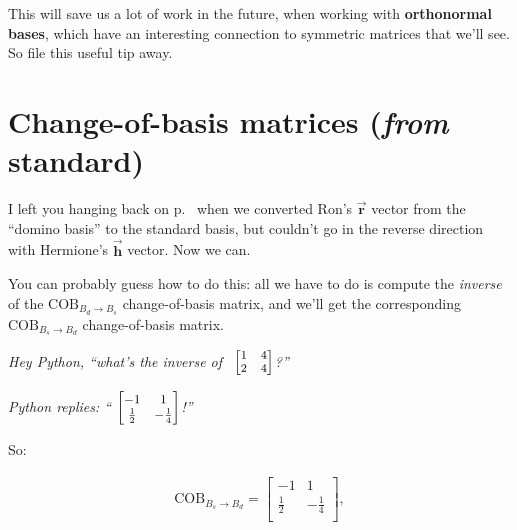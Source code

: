 
This will save us a lot of work in the future, when working with
\textbf{orthonormal bases}, which have an interesting connection to symmetric
matrices that we'll see. So file this useful tip away.


\section[Change-of-basis matrices]{\large Change-of-basis matrices (\textit{from} standard)}

\label{changeOfBasisOtherWayFinally}


I left you hanging back on p.~\pageref{changeOfBasisOtherWayCliffhanger} when
we converted Ron's $\overrightarrow{\textbf{r}}$ vector from the ``domino
basis'' to the standard basis, but couldn't go in the reverse direction with
Hermione's $\overrightarrow{\textbf{h}}$ vector. Now we can.

\smallskip
You can probably guess how to do this: all we have to do is compute the
\textit{inverse} of the $\textrm{COB}_{B_d \rightarrow B_s}$ change-of-basis
matrix, and we'll get the corresponding $\textrm{COB}_{B_s \rightarrow B_d}$
change-of-basis matrix.

\label{askPython3}
\begin{center}
\textit{Hey Python, ``what's the inverse of \
${\footnotesize \begin{bmatrix}
1 & 4 \\
2 & 4 \\
\end{bmatrix}}$?''
}

\textit{Python replies: ``
${\small
\begingroup
\begin{bmatrix}
-1 & 1 \\
\frac{1}{2} & -\frac{1}{4} \\
\end{bmatrix}
\endgroup}$!''
}
\end{center}

So:

\vspace{-.15in}
\begin{align*}
\textrm{COB}_{B_s \rightarrow B_d} =
\begin{bmatrix}
-1 & 1 \\
\frac{1}{2} & -\frac{1}{4} \\
\end{bmatrix},
\end{align*}
\vspace{-.15in}

